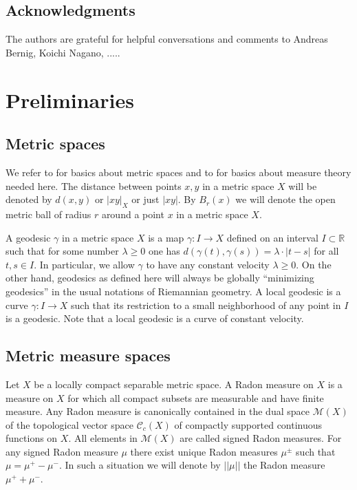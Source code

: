 \documentclass[12pt,leqno]{amsart}
\numberwithin{equation}{section}
\theoremstyle{definition}
\theoremstyle{remark}
\newcommand{\R}{\mathbb{R}}
\begin{document}
\subsection{Acknowledgments}  The authors are grateful for helpful conversations and comments to Andreas Bernig, Koichi Nagano,  ..... 


\section{Preliminaries}
\subsection{Metric spaces}
We refer to \cite{BBI01} for basics about metric spaces and to \cite{Federer} for basics about measure theory needed here.
The distance between points $x,y$ in a metric space $X$ will be denoted by $d(x,y)$ or $|xy|_X$ or just $|xy|$.
By $B_r(x)$ we will denote the open metric ball of radius $r$ around a point $x$ in a metric space $X$.


A geodesic $\gamma$ in a metric space $X$ is  a map $\gamma :I\to X$ defined on an interval $I \subset \R$ such that for some number $\lambda \geq 0$ one has
$d(\gamma (t),\gamma (s)) =\lambda \cdot |t-s|$ for all $t,s\in I$. In particular, we allow $\gamma$ to have any constant velocity $\lambda \geq 0$. On the other hand, geodesics
as defined here will always be globally ``minimizing geodesics'' in the usual notations of Riemannian geometry.
A local geodesic is a curve $\gamma: I\to X$ such that its restriction to a small neighborhood of any point in $I$ is  a geodesic. Note that a local geodesic is a curve of constant velocity.

\subsection{Metric measure spaces}
Let $X$ be a locally compact separable metric space. A Radon measure on $X$ is a measure on $X$ for which all compact subsets are measurable and have finite measure.
Any Radon measure is canonically contained in the dual space $\mathcal M(X)$ of the topological vector space $\mathcal C_c (X)$ of compactly supported continuous functions on $X$.
All elements in $\mathcal M(X)$ are called signed Radon measures. For any signed Radon measure $\mu$ there exist unique Radon measures $\mu ^{\pm}$ such that $\mu =\mu ^+- \mu ^-$.
In such a situation we will denote by $||\mu||$ the Radon measure $\mu ^+ +\mu ^-$.
\end{document}

